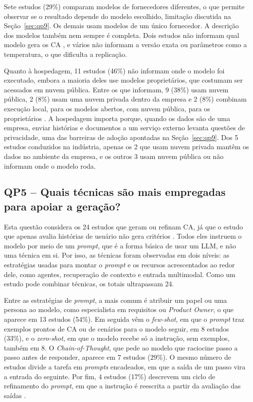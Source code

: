 Sete estudos (29\%) comparam modelos de fornecedores diferentes, o que permite observar se o resultado depende do modelo escolhido, limitação discutida na Seção~\ref{sec:qp9}. Os demais usam modelos de um único fornecedor. A descrição dos modelos também nem sempre é completa. Dois estudos não informam qual modelo gera os CA \cite{lotfi2025,karimi2026}, e vários não informam a versão exata ou parâmetros como a temperatura, o que dificulta a replicação.

Quanto à hospedagem, 11 estudos (46\%) não informam onde o modelo foi executado, embora a maioria deles use modelos proprietários, que costumam ser acessados em nuvem pública. Entre os que informam, 9 (38\%) usam nuvem pública, 2 (8\%) usam uma nuvem privada dentro da empresa \cite{baker2026,ferreira2025} e 2 (8\%) combinam execução local, para os modelos abertos, com nuvem pública, para os proprietários \cite{li2024,huang2026}. A hospedagem importa porque, quando os dados são de uma empresa, enviar histórias e documentos a um serviço externo levanta questões de privacidade, uma das barreiras de adoção apontadas na Seção~\ref{sec:qp9}. Dos 5 estudos conduzidos na indústria, apenas os 2 que usam nuvem privada mantêm os dados no ambiente da empresa, e os outros 3 usam nuvem pública ou não informam onde o modelo roda.

\subsection{QP5 -- Quais técnicas são mais empregadas para apoiar a geração?}
\label{sec:qp5}

Esta questão considera os 24 estudos que geram ou refinam CA, já que o estudo que apenas avalia histórias de usuário não gera critérios \cite{ma2026}. Todos eles instruem o modelo por meio de um \textit{prompt}, que é a forma básica de usar um LLM, e não uma técnica em si. Por isso, as técnicas foram observadas em dois níveis: as estratégias usadas para montar o \textit{prompt} e os recursos acrescentados ao redor dele, como agentes, recuperação de contexto e entrada multimodal. Como um estudo pode combinar técnicas, os totais ultrapassam 24.

Entre as estratégias de \textit{prompt}, a mais comum é atribuir um papel ou uma persona ao modelo, como especialista em requisitos ou \textit{Product Owner}, o que aparece em 13 estudos (54\%). Em seguida vêm o \textit{few-shot}, em que o \textit{prompt} traz exemplos prontos de CA ou de cenários para o modelo seguir, em 8 estudos (33\%), e o \textit{zero-shot}, em que o modelo recebe só a instrução, sem exemplos, também em 8. O \textit{Chain-of-Thought}, que pede ao modelo que raciocine passo a passo antes de responder, aparece em 7 estudos (29\%). O mesmo número de estudos divide a tarefa em \textit{prompts} encadeados, em que a saída de um passo vira a entrada do seguinte. Por fim, 4 estudos (17\%) descrevem um ciclo de refinamento do \textit{prompt}, em que a instrução é reescrita a partir da avaliação das saídas \cite{ferreira2025,jurgelaitis2026,avasiloaie2025,khelifa2026}.


